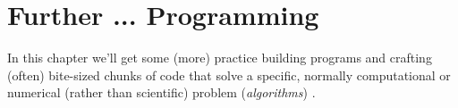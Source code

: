 \documentclass{tufte-book} %
\begin{document}


\chapter{Further ... Programming}
\label{ch:04}


In this chapter we'll get some (more) practice building programs and crafting (often) bite-sized chunks of code that solve a specific, normally computational or numerical (rather than scientific) problem (\textit{algorithms})
.
\end{document}
